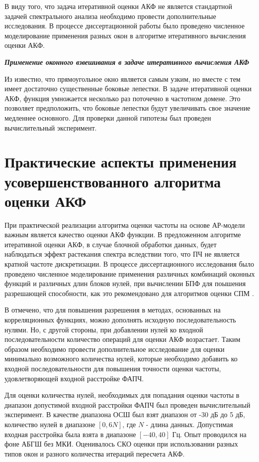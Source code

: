 В виду того, что задача итеративной оценки АКФ не является стандартной задачей спектрального анализа необходимо провести дополнительные исследования. В процессе
диссертационной работы было проведено численное моделирование применения разных окон в алгоритме итеративного вычисления оценки АКФ.

{\bf{\textit{Применение оконного взвешивания в задаче итеративного вычисления АКФ}}}

Из \cite{bolshakov-book} известно, что прямоугольное окно является самым узким, но вместе с тем имеет достаточно существенные боковые лепестки. В задаче итеративной оценки
АКФ, функция умножается несколько раз поточечно в частотном домене. Это позволяет предположить, что боковые лепестки будут увеличивать свое значение медленнее основного.
Для проверки данной гипотезы был проведен вычислительный эксперимент.

\section{Практические аспекты применения усовершенствованного алгоритма оценки АКФ}
\label{lab:sec2_windows}

При практической реализации алгоритма оценки частоты на основе АР-модели важным является качество оценки АКФ функции. В предложенном алгоритме итеративной оценки АКФ,
в случае блочной обработки данных, будет наблюдаться эффект растекания спектра вследствии того, что ПЧ не является кратной частоте дискретизации. В процессе диссертационного
исследования было проведено численное моделирование применения различных комбинаций оконных функций и различных длин блоков нулей, при вычислении БПФ для поышения
разрешающей способности, как это рекомендовано для алгоритмов оценки СПМ \cite{bolshakov-book}.

В \cite{bolshakov-book} отмечено, что для повышения разрешения в методах, основанных на корреляционных функциях, можно дополнять исходную последовательность нулями.
Но, с другой стороны, при добавлении нулей ко входной последовательности количество операций для оценки АКФ возрастает. Таким образом необходимо провести дополнительное
исследование для оценки минимально возможного количества нулей, которые необходимо добавить ко входной последовательности для повышения точности оценки частоты,
удовлетворяющей входной расстройке ФАПЧ.

Для оценки количества нулей, необходимых для попадания оценки частоты в диапазон допустимой входной расстройки ФАПЧ был проведен вычислительный эксперимент. В качестве диапазона
ОСШ был взят диапазон от -30 дБ до 5 дБ, количество нулей в диапазоне ${[0, 6N]}$, где ${N}$ - длина данных. Допустимая входная расстройка была взята в диапазоне ${[-40, 40]}$ Гц.
Опыт проводился на фоне АБГШ без МКИ. Оценивалось СКО оценки при использовании разных типов окон и разного количества итераций пересчета АКФ.

